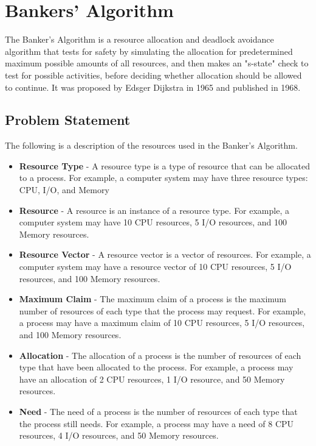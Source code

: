 \section{Bankers' Algorithm}
\label{sec:bankers}

The Banker's Algorithm is a resource allocation and deadlock
avoidance algorithm that tests for safety by simulating the
allocation for predetermined maximum possible amounts of all
resources, and then makes an "s-state" check to test for possible
activities, before deciding whether allocation should be allowed to continue.
It was proposed by Edsger Dijkstra in 1965 and published in 1968.

\subsection{Problem Statement}

The following is a description of the resources used in the Banker's Algorithm.

\begin{itemize}
	\item \textbf{Resource Type} - A resource type is a type of resource that can be allocated to a process. For example, a computer system may have three resource types: CPU, I/O, and Memory\
	\item \textbf{Resource} - A resource is an instance of a resource type. For example, a computer system may have 10 CPU resources, 5 I/O resources, and 100 Memory resources.
	\item \textbf{Resource Vector} - A resource vector is a vector of resources. For example, a computer system may have a resource vector of 10 CPU resources, 5 I/O resources, and 100 Memory resources.
	\item \textbf{Maximum Claim} - The maximum claim of a process is the maximum number of resources of each type that the process may request. For example, a process may have a maximum claim of 10 CPU resources, 5 I/O resources, and 100 Memory resources.
	\item \textbf{Allocation} - The allocation of a process is the number of resources of each type that have been allocated to the process. For example, a process may have an allocation of 2 CPU resources, 1 I/O resource, and 50 Memory resources.
	\item \textbf{Need} - The need of a process is the number of resources of each type that the process still needs. For example, a process may have a need of 8 CPU resources, 4 I/O resources, and 50 Memory resources.
\end{itemize}

